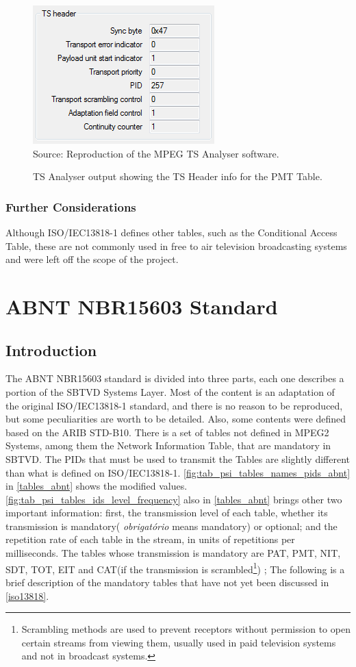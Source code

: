 \documentclass[
	12pt,				%
	openright,			%
	twoside,			%
	a4paper,			%
	brazil,
	french,				%
	english
	]{abntex2}
\begin{document}
\begin{figure}[!hb]
\centering
\caption{TS Analyser output showing the TS Header info for the PMT Table.}
\includegraphics[width=0.4\linewidth]{figuras/TSAnalyser_close_PMT_TS_Header.png}
\\Source: Reproduction of the MPEG TS Analyser software.
\label{fig:TSAnalyser_close_PMT_TS_Header}
\end{figure}

\subsection{Further Considerations}

Although ISO/IEC13818-1 defines other tables, such as the Conditional Access Table, these are not commonly used in free to air television broadcasting systems\cite{} and were left off the scope of the project.

\chapter{ABNT NBR15603 Standard}
\label{nbr15603}

\section{Introduction}

The ABNT NBR15603 standard is divided into three parts, each one describes a portion of the SBTVD Systems Layer. Most of the content is an adaptation of the original ISO/IEC13818-1 standard, and there is no reason to be reproduced, but some peculiarities are worth to be detailed. Also, some contents were defined based on the ARIB STD-B10. There is a set of tables not defined in MPEG2 Systems, among them the Network Information Table, that are mandatory in SBTVD. The PIDs that must be used to transmit the Tables are slightly different than what is defined on ISO/IEC13818-1. \autoref{fig:tab_psi_tables_names_pids_abnt} in \autoref{tables_abnt} shows the modified values. \autoref{fig:tab_psi_tables_ids_level_frequency} also in \autoref{tables_abnt} brings other two important information: first, the transmission level of each table, whether its transmission is mandatory( \textit{obrigatório} means mandatory) or optional; and the repetition rate of each table in the stream, in units of repetitions per milliseconds. The tables whose transmission is mandatory are PAT, PMT, NIT, SDT, TOT, EIT and CAT(if the transmission is scrambled\footnote{Scrambling methods are used to prevent receptors without permission to open certain streams from viewing them, usually used in paid television systems and not in broadcast systems.}) ;  The following is a brief description of the mandatory tables that have not yet been discussed in \autoref{iso13818}.
\end{document}
